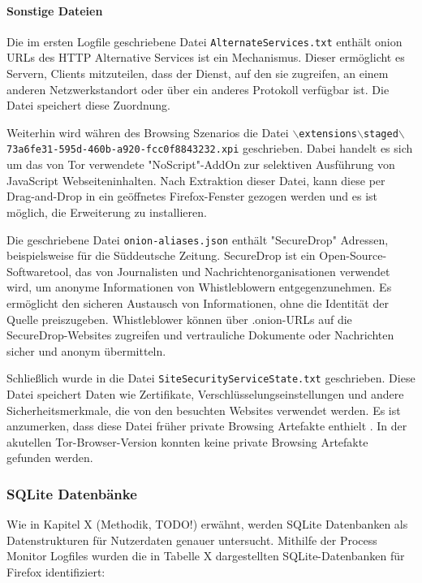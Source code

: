 \paragraph*{Sonstige Dateien}
Die im ersten Logfile geschriebene Datei \texttt{AlternateServices.txt}
enthält onion URLs des HTTP Alternative Services ist ein Mechanismus. Dieser ermöglicht es Servern, Clients mitzuteilen, dass der Dienst, auf den sie zugreifen, an einem anderen Netzwerkstandort oder über ein anderes Protokoll verfügbar ist. Die Datei speichert diese Zuordnung.

Weiterhin wird währen des Browsing Szenarios die Datei \texttt{$\backslash$extensions$\backslash$staged$\backslash${73a6fe31-595d-460b-a920-fcc0f8843232}.xpi} geschrieben. Dabei handelt es sich um das von Tor verwendete "NoScript"-AddOn zur selektiven Ausführung von JavaScript Webseiteninhalten.
Nach Extraktion dieser Datei, kann diese per Drag-and-Drop in ein geöffnetes Firefox-Fenster gezogen werden und es ist möglich, die Erweiterung zu installieren.

Die geschriebene Datei \texttt{onion-aliases.json} enthält "SecureDrop" Adressen, beispielsweise für die Süddeutsche Zeitung.  %
SecureDrop ist ein Open-Source-Softwaretool, das von Journalisten und Nachrichtenorganisationen verwendet wird, um anonyme Informationen von Whistleblowern entgegenzunehmen. Es ermöglicht den sicheren Austausch von Informationen, ohne die Identität der Quelle preiszugeben. Whistleblower können über .onion-URLs auf die SecureDrop-Websites zugreifen und vertrauliche Dokumente oder Nachrichten sicher und anonym übermitteln.


Schließlich wurde in die Datei \texttt{SiteSecurityServiceState.txt} geschrieben.
Diese Datei speichert Daten wie Zertifikate, Verschlüsselungseinstellungen und andere Sicherheitsmerkmale, die von den besuchten Websites verwendet werden.
Es ist anzumerken, dass diese Datei früher private Browsing Artefakte enthielt %
. In der akutellen Tor-Browser-Version konnten keine private Browsing Artefakte gefunden werden.
	
\subsubsection*{SQLite Datenbänke}
			Wie in Kapitel X (Methodik, TODO!) erwähnt, werden SQLite Datenbanken als Datenstrukturen für Nutzerdaten genauer untersucht. Mithilfe der Process Monitor Logfiles wurden die in Tabelle X dargestellten SQLite-Datenbanken für Firefox identifiziert:		
 
